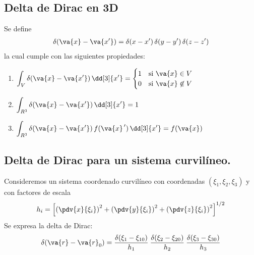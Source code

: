 \subsection*{Delta de Dirac en 3D}
Se define
\begin{align*}
\delta(\va{x} - \va{x^{\prime}}) = \delta(x - x^{\prime}) \,\delta(y - y^{\prime}) \, \delta(z - z^{\prime})
\end{align*}
la cual cumple con las siguientes propiedades:
\begin{enumerate}[itemsep=10pt,parsep=2pt, label=\roman*)]
\item $\displaystyle \int_{V} \delta(\va{x} - \va{x^{\prime}}) \, \dd[3]{x^{\prime}} = \begin{cases}
1 & \mbox{si } \va{x} \in V \\
0 & \mbox{si } \va{x} \not\in V \\
\end{cases}$
\item $\displaystyle \int_{R^{3}} \delta(\va{x} - \va{x^{\prime}}) \, \dd[3]{x^{\prime}} = 1$
\item $\displaystyle \int_{R^{3}} \delta(\va{x} - \va{x^{\prime}}) \, f(\va{x}^{\, \prime}) \, \dd[3]{x^{\prime}} = f(\va{x})$
\end{enumerate}
\subsection*{Delta de Dirac para un sistema curvilíneo.}
Consideremos un sistema coordenado curvilíneo con coordenadas $(\xi_{1}, \xi_{2}, \xi_{3})$ y con factores de escala
\begin{align*}
h_{i} = \left[ \left( \pdv{x}{\xi_{i}} \right)^{2} + \left( \pdv{y}{\xi_{i}} \right)^{2} + \left( \pdv{z}{\xi_{i}} \right)^{2}\right]^{1/2}
\end{align*}
Se expresa la delta de Dirac:
\begin{align*}
\delta(\va{r} - \va{r}_{0}) = \dfrac{\delta(\xi_{1} - \xi_{10})}{h_{1}} \: \dfrac{\delta(\xi_{2} - \xi_{20})}{h_{2}} \: \dfrac{\delta(\xi_{3} - \xi_{30})}{h_{3}}
\end{align*}
